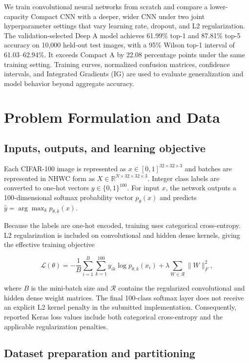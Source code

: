 \documentclass[conference]{IEEEtran}
\begin{document}
We train convolutional neural networks from scratch and compare a lower-capacity Compact CNN with a deeper, wider CNN under two joint hyperparameter settings that vary learning rate, dropout, and L2 regularization. The validation-selected Deep A model achieves 61.99\% top-1 and 87.81\% top-5 accuracy on 10,000 held-out test images, with a 95\% Wilson top-1 interval of 61.03--62.94\%. It exceeds Compact A by 22.08 percentage points under the same training setting. Training curves, normalized confusion matrices, confidence intervals, and Integrated Gradients (IG) are used to evaluate generalization and model behavior beyond aggregate accuracy.


\section{Problem Formulation and Data}

\subsection{Inputs, outputs, and learning objective}

Each CIFAR-100 image is represented as
$x\in[0,1]^{32\times32\times3}$ and batches are represented in NHWC form as
$X\in\mathbb{R}^{N\times32\times32\times3}$.
Integer class labels are converted to one-hot vectors
$y\in\{0,1\}^{100}$.
For input $x$, the network outputs a 100-dimensional softmax probability vector
$p_{\theta}(x)$ and predicts
$\hat y=\arg\max_k p_{\theta,k}(x)$.

Because the labels are one-hot encoded, training uses categorical cross-entropy. L2 regularization is included on convolutional and hidden dense kernels, giving the effective training objective

\begin{equation}
\mathcal{L}(\theta)
=
-\frac{1}{B}
\sum_{i=1}^{B}
\sum_{k=1}^{100}
y_{ik}\log p_{\theta,k}(x_i)
+
\lambda
\sum_{W\in\mathcal{R}}
\|W\|_F^2 ,
\end{equation}

where $B$ is the mini-batch size and $\mathcal{R}$ contains the regularized convolutional and hidden dense weight matrices. The final 100-class softmax layer does not receive an explicit L2 kernel penalty in the submitted implementation. Consequently, reported Keras loss values include both categorical cross-entropy and the applicable regularization penalties.


\subsection{Dataset preparation and partitioning}
\end{document}
